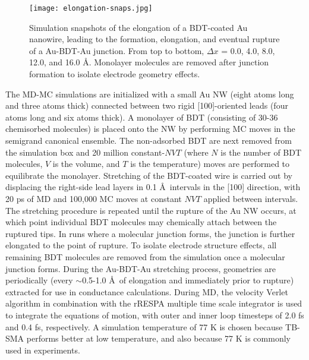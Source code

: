 \documentclass[10pt]{report}  %
\begin{document}
\begin{figure}[t]
	\centering
	\texttt{[image: elongation-snaps.jpg]}
	\caption{Simulation snapshots of the elongation of a BDT-coated Au nanowire, leading to the formation, elongation, and eventual rupture of a Au-BDT-Au junction. From top to bottom, $\Delta$$x$ = 0.0, 4.0, 8.0, 12.0, and 16.0 \AA. Monolayer molecules are removed after junction formation to isolate electrode geometry effects. }
	\label{fig:elongation-snaps}
\end{figure}

The MD-MC simulations are initialized with a small Au NW (eight atoms long and three atoms thick) connected between two rigid [100]-oriented leads (four atoms long and six atoms thick). A monolayer of BDT (consisting of 30-36 chemisorbed molecules) is placed onto the NW by performing MC moves in the semigrand canonical ensemble. The non-adsorbed BDT are next removed from the simulation box and 20 million constant-$NVT$ (where $N$ is the number of BDT molecules, $V$ is the volume, and $T$ is the temperature) moves are performed to equilibrate the monolayer.  Stretching of the BDT-coated wire is carried out by displacing the right-side lead layers in 0.1 \AA\ intervals in the [100] direction, with 20 ps of MD and 100,000 MC moves at constant $NVT$ applied between intervals. The stretching procedure is repeated until the rupture of the Au NW occurs, at which point individual BDT molecules may chemically attach between the ruptured tips. In runs where a molecular junction forms, the junction is further elongated to the point of rupture.  To isolate electrode structure effects, all remaining BDT molecules are removed from the simulation once a molecular junction forms. During the Au-BDT-Au stretching process, geometries are periodically (every $\sim$0.5-1.0 \AA\ of elongation and immediately prior to rupture) extracted for use in conductance calculations. During MD, the velocity Verlet algorithm in combination with the rRESPA multiple time scale integrator is used to integrate the equations of motion, with outer and inner loop timesteps of 2.0 fs and 0.4 fs, respectively.  A simulation temperature of 77 K is chosen because TB-SMA performs better at low temperature, \cite{Iacovella:2011} and also because 77 K is commonly used in experiments. \cite{Tsutsui:2009}
\end{document}
